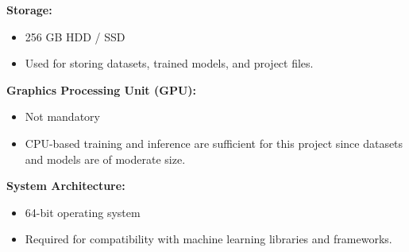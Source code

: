 \textbf{Storage:}
\begin{itemize}
    \item 256 GB HDD / SSD
    \item Used for storing datasets, trained models, and project files.
\end{itemize}

\textbf{Graphics Processing Unit (GPU):}
\begin{itemize}
    \item Not mandatory
    \item CPU-based training and inference are sufficient for this project since datasets and models are of moderate size.
\end{itemize}

\textbf{System Architecture:}
\begin{itemize}
    \item 64-bit operating system
    \item Required for compatibility with machine learning libraries and frameworks.
\end{itemize}
